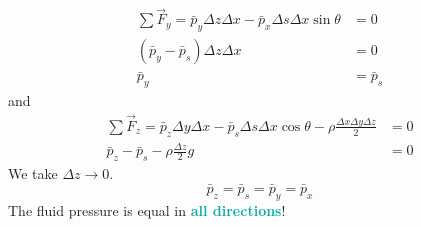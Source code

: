 \documentclass[twoside]{article}
\newcommand{\highlightbluetext}[1]{\textcolor[HTML]{09ACA6}{\textbf{#1}}}
\numberwithin{equation}{section}
\begin{document}
{\begin{minipage}[c]{\textwidth-6cm}
			\begin{align*}
				\sum \vec{F}_y = \bar{p}_y \Delta z \Delta x-\bar{p}_x \Delta s \Delta x \sin \theta &= 0 \\
				(\bar{p}_y-\bar{p}_s) \Delta z \Delta x &= 0 \\
				\bar{p}_y &= \bar{p}_s
			\end{align*}
			and
			\begin{align*}
				\sum \vec{F}_z = \bar{p}_z \Delta y \Delta x-\bar{p}_s \Delta s \Delta x \cos \theta-\rho \frac{\Delta x \Delta y \Delta z}{2} &= 0 \\
				\bar{p}_z-\bar{p}_s-\rho \frac{\Delta z}{2} g &= 0
			\end{align*}
			We take $\Delta z \to 0$.
			\begin{equation*}
				\bar{p}_z = \bar{p}_s = \bar{p}_y = \bar{p}_x
			\end{equation*}
			The fluid pressure is equal in \highlightbluetext{all directions}!
		\end{minipage}
	}
	
	\newpage
	
\end{document}
